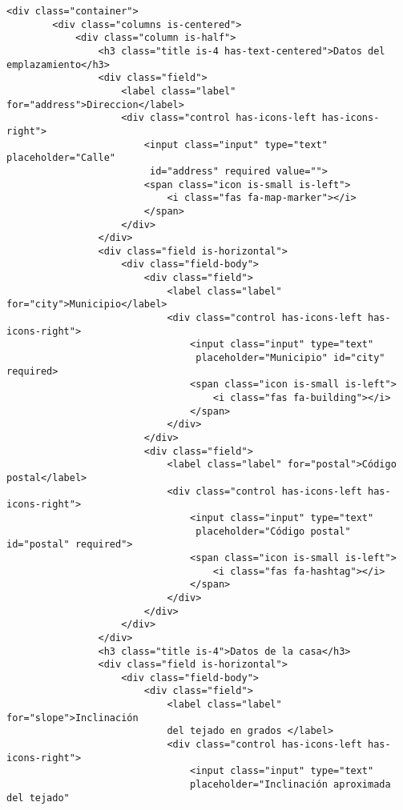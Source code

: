 \begin{lstlisting}[style=ES6, caption={public/index.html}]
    <div class="container">
        <div class="columns is-centered">
            <div class="column is-half">
                <h3 class="title is-4 has-text-centered">Datos del emplazamiento</h3>
                <div class="field">
                    <label class="label" for="address">Direccion</label>
                    <div class="control has-icons-left has-icons-right">
                        <input class="input" type="text" placeholder="Calle"
                         id="address" required value="">
                        <span class="icon is-small is-left">
                            <i class="fas fa-map-marker"></i>
                        </span>
                    </div>
                </div>
                <div class="field is-horizontal">
                    <div class="field-body">
                        <div class="field">
                            <label class="label" for="city">Municipio</label>
                            <div class="control has-icons-left has-icons-right">
                                <input class="input" type="text"
                                 placeholder="Municipio" id="city" required>
                                <span class="icon is-small is-left">
                                    <i class="fas fa-building"></i>
                                </span>
                            </div>
                        </div>
                        <div class="field">
                            <label class="label" for="postal">Código postal</label>
                            <div class="control has-icons-left has-icons-right">
                                <input class="input" type="text"
                                 placeholder="Código postal" id="postal" required">
                                <span class="icon is-small is-left">
                                    <i class="fas fa-hashtag"></i>
                                </span>
                            </div>
                        </div>
                    </div>
                </div>
                <h3 class="title is-4">Datos de la casa</h3>
                <div class="field is-horizontal">
                    <div class="field-body">
                        <div class="field">
                            <label class="label" for="slope">Inclinación 
                            del tejado en grados </label>
                            <div class="control has-icons-left has-icons-right">
                                <input class="input" type="text" 
                                placeholder="Inclinación aproximada del tejado"

\end{lstlisting}
